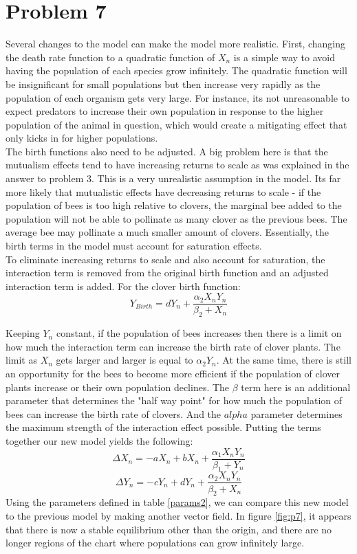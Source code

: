 \documentclass[12pt,a4paper,titlepage]{report}
\begin{document}
	\section*{Problem 7}
		Several changes to the model can make the model more realistic. First, changing the death rate function to a quadratic function of \(X_n\) is a simple way to avoid having the population of each species grow infinitely. The quadratic function will be insignificant for small populations but then increase very rapidly as the population of each organism gets very large. For instance, its not unreasonable to expect predators to increase their own population in response to the higher population of the animal in question, which would create a mitigating effect that only kicks in for higher populations. \\
		
		The birth functions also need to be adjusted. A big problem here is that the mutualism effects tend to have increasing returns to scale as was explained in the answer to problem 3. This is a very unrealistic assumption in the model. Its far more likely that mutualistic effects have decreasing returns to scale - if the population of bees is too high relative to clovers, the marginal bee added to the population will not be able to pollinate as many clover as the previous bees. The average bee may pollinate a much smaller amount of clovers. Essentially, the birth terms in the model must account for saturation effects. \\
		
		To eliminate increasing returns to scale and also account for saturation, the interaction term is removed from the original birth function and an adjusted interaction term is added. For the clover birth function: 
		\[Y_{Birth} = dY_{n} + \frac{\alpha_{2}X_{n}Y_{n}}{\beta_2 + X_{n}}\]
		
		Keeping \(Y_n\) constant, if the population of bees increases then there is a limit on how much the interaction term can increase the birth rate of clover plants. The limit as \(X_n\) gets larger and larger is equal to \(\alpha_2 Y_{n}\). At the same time, there is still an opportunity for the bees to become more efficient if the population of clover plants increase or their own population declines. The \(\beta\) term here is an additional parameter that determines the "half way point" for how much the population of bees can increase the birth rate of clovers. And the \(alpha\) parameter determines the maximum strength of the interaction effect possible. Putting the terms together our new model yields the following:
		\[\Delta X_{n} = -aX_{n} + b X_{n} + \frac{\alpha_{1}X_{n}Y_{n}}{\beta_1 + Y_{n}}\]
		\[\Delta Y_{n} = -cY_{n} + d Y_{n} + \frac{\alpha_{2}X_{n}Y_{n}}{\beta_2 + X_{n}}\]
		Using the parameters defined in table \ref{params2}, we can compare this new model to the previous model by making another vector field. In figure \ref{fig:p7}, it appears that there is now a stable equilibrium other than the origin, and there are no longer regions of the chart where populations can grow infinitely large. \\
		
\end{document}
